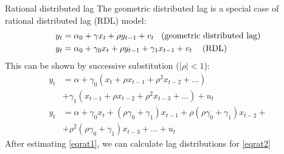 \documentclass{beamer}
\begin{document}
\begin{frame}{Rational distributed lag}
The geometric distributed lag is a special case of \\rational distributed lag (RDL) model:
\begin{align} \nonumber
y_t & = \alpha_0+\gamma x_t + \rho y_{t-1} + v_t \hspace{0.3cm} \textnormal{(geometric distributed lag)}\\\label{eqrat1} 
y_t & = \alpha_0+\gamma_0 x_t + \rho y_{t-1} +\gamma_1 x_{t-1} + v_t  \hspace{0.3cm} \textnormal{ (RDL)}
\end{align}
This can be shown by successive substitution ($|\rho| < 1$):
\begin{align}\nonumber
y_t & = \alpha + \gamma_0 (x_t + \rho x_{t-1} + \rho^2 x_{t-2}+\dots) \\ & + \gamma_1 (x_{t-1} + \rho x_{t-2} + \rho^2 x_{t-3}+\dots) + u_t \\ \nonumber
y_t & = \alpha + \gamma_0 x_t + (\rho \gamma_0 + \gamma_1) x_{t-1} + \rho (\rho \gamma_0 + \gamma_1) x_{t-2} +\\ & + \rho^2 (\rho \gamma_0 + \gamma_1) x_{t-3} + \dots + u_t \label{eqrat2}
\end{align}
After estimating \eqref{eqrat1}, we can calculate lag distributions for \eqref{eqrat2}

\end{frame}
\end{document}
